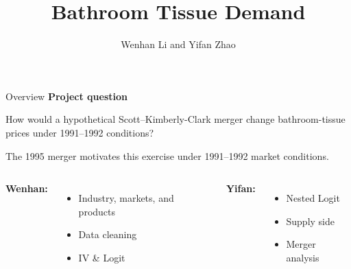 \documentclass[aspectratio=169,11pt]{beamer}
\title{Bathroom Tissue Demand}
\author{Wenhan Li and Yifan Zhao}
\begin{document}
\begin{frame}{Overview}
\textbf{Project question}\par\vspace{2mm}
How would a hypothetical Scott--Kimberly-Clark merger change bathroom-tissue prices under 1991--1992 conditions?

\vspace{5mm}
The 1995 merger motivates this exercise under 1991--1992 market conditions.\par\medskip

\vspace{5mm}


\begin{columns}[T,onlytextwidth]
\textbf{Wenhan:}
\begin{itemize}\setlength\itemsep{2mm}
\item Industry, markets, and products
\item Data cleaning
\item IV \& Logit
\end{itemize}
\textbf{Yifan:}
\begin{itemize}\setlength\itemsep{2mm}
\item Nested Logit
\item Supply side
\item Merger analysis
\end{itemize}
\end{columns}
\end{frame}
\end{document}

